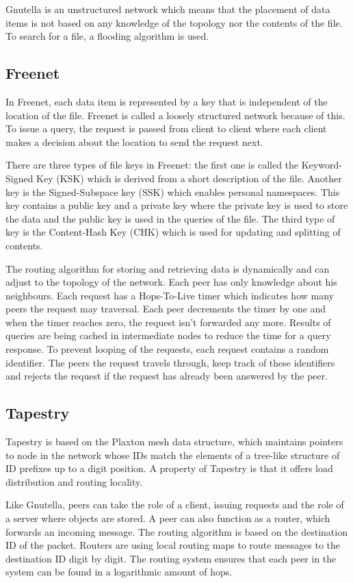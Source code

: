 \documentclass{article}
\begin{document}
		Gnutella is an unstructured network which means that the placement of data items is not based on any knowledge of the topology nor the contents of the file. To search for a file, a flooding algorithm is used.
	
	\subsection{Freenet} %
		In Freenet, each data item is represented by a key that is independent of the location of the file. Freenet is called a loosely structured network because of this. To issue a query, the request is passed from client to client where each client makes a decision about the location to send the request next.
		
		There are three types of file keys in Freenet: the first one is called the Keyword-Signed Key (KSK) which is derived from a short description of the file. Another key is the Signed-Subspace key (SSK) which enables personal namespaces. This key contains a public key and a private key where the private key is used to store the data and the public key is used in the queries of the file. The third type of key is the Content-Hash Key (CHK) which is used for updating and splitting of contents.
		
		The routing algorithm for storing and retrieving data is dynamically and can adjust to the topology of the network. Each peer has only knowledge about his neighbours. Each request has a Hops-To-Live timer which indicates how many peers the request may traversal. Each peer decrements the timer by one and when the timer reaches zero, the request isn't forwarded any more. Results of queries are being cached in intermediate nodes to reduce the time for a query response. To prevent looping of the requests, each request contains a random identifier. The peers the request travels through, keep track of these identifiers and rejects the request if the request has already been answered by the peer.
		
	\subsection{Tapestry} %
		Tapestry is based on the Plaxton mesh data structure, which maintains pointers to node in the network whose IDs match the elements of a tree-like structure of ID prefixes up to a digit position. A property of Tapestry is that it offers load distribution and routing locality.
		
		Like Gnutella, peers can take the role of a client, issuing requests and the role of a server where objects are stored. A peer can also function as a router, which forwards an incoming message. The routing algorithm is based on the destination ID of the packet. Routers are using local routing maps to route messages to the destination ID digit by digit. The routing system ensures that each peer in the system can be found in a logarithmic amount of hops.
		
\end{document}
